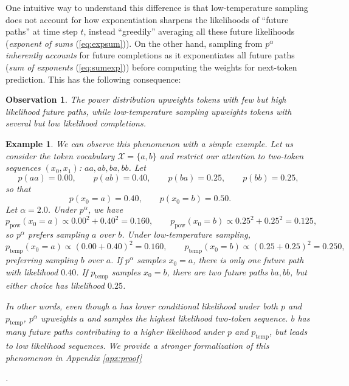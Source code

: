 \documentclass{article}
\newtheorem{observation}{Observation}
\newtheorem{example}{Example}
\begin{document}
One intuitive way to understand this difference is that low-temperature sampling does not account for how exponentiation sharpens the likelihoods of ``future paths'' at time step $t$, instead ``greedily'' averaging all these future likelihoods (\textit{exponent of sums} (\ref{eq:expsum})). On the other hand, sampling from $p^{\alpha}$ \textit{inherently accounts} for future completions as it exponentiates all future paths (\textit{sum of exponents} (\ref{eq:sumexp})) before computing the weights for next-token prediction. This has the following consequence:

\begin{observation}
    The power distribution upweights tokens with few but high likelihood future paths, while low-temperature sampling upweights tokens with several but low likelihood completions.
\end{observation}

\begin{example}
    {\rm We can observe this phenomenon with a simple example. Let us consider the token vocabulary $\mathcal{X} = \{a, b\}$ and restrict our attention to two-token sequences $(x_0, x_1)$: $aa, ab, ba, bb$. Let \[
        p(aa) = 0.00, \qquad p(ab) = 0.40, \qquad p(ba) = 0.25, \qquad p(bb) = 0.25,
    \] so that \[
        p(x_0 = a) = 0.40, \qquad p(x_0 = b) = 0.50. \qquad
    \] Let $\alpha = 2.0$. Under $p^{\alpha}$, we have \[p_{\text{pow}}(x_0 = a) \propto 0.00^2 + 0.40^2 = 0.160, \qquad p_{\text{pow}}(x_0 = b) \propto 0.25^2 + 0.25^2 = 0.125,\] so $p^{\alpha}$ prefers sampling $a$ over $b$. Under low-temperature sampling, \[p_{\text{temp}}(x_0 = a) \propto (0.00 + 0.40)^2 = 0.160, \qquad p_{\text{temp}}(x_0 = b) \propto (0.25 + 0.25)^2 = 0.250,\] preferring sampling $b$ over $a$. If $p^{\alpha}$ samples $x_0=a$, there is only one future path with likelihood $0.40$. If $p_{\text{temp}}$ samples $x_0=b$, there are two future paths $ba, bb$, but either choice has likelihood $0.25$. 
    
    In other words, even though $a$ has lower conditional likelihood under both $p$ and $p_{\text{temp}}$, $p^{\alpha}$ upweights $a$ and samples the highest likelihood two-token sequence. $b$ has many future paths contributing to a higher likelihood under $p$ and $p_{\text{temp}}$, but leads to low likelihood sequences. We provide a stronger formalization of this phenomenon in Appendix \ref{apx:proof}}.
\end{example}

 
\end{document}
